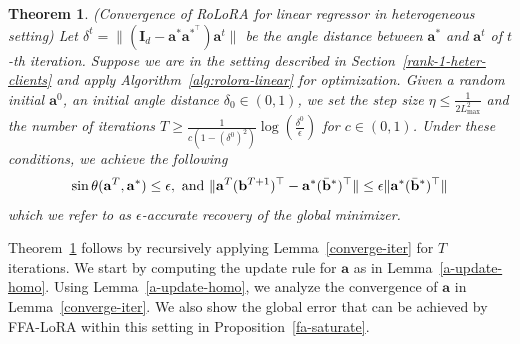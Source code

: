 \documentclass{article}
\theoremstyle{plain}
\newtheorem{theorem}{Theorem}[section]
\theoremstyle{definition}
\theoremstyle{remark}
\begin{document}
\begin{theorem} (Convergence of RoLoRA for linear regressor in heterogeneous setting) \label{convergence}
Let $\delta^t = \lVert (\mathbf{I}_d-\mathbf{a}^*\mathbf{a}^{*^\top})\mathbf{a}^t\rVert $ be the angle distance between $\mathbf{a}^{*}$ and $\mathbf{a}^{t}$ of $t$-th iteration. Suppose we are in the setting described in Section~\ref{rank-1-heter-clients} and apply Algorithm~\ref{alg:rolora-linear} for optimization. Given a random initial $\mathbf{a}^0$, an initial angle distance $\delta_0 \in (0,1)$, we set the step size $\eta \leq \frac{1}{2L^2_{\max}}$ and the number of iterations $T \geq \frac{1}{c (1-(\delta^{0})^2)} \log(\frac{\delta^0}{\epsilon}) $ for $c \in (0,1)$. Under these conditions, we achieve the following
\begin{align}
    \sin \theta (\mathbf{a}^T, \mathbf{a}^*)\leq \epsilon \nonumber , \text{ and } \lVert \mathbf{a}^T(\mathbf{b}^{T+1})^\top- \mathbf{a}^* (\Bar{\mathbf{b}}^*)^\top\rVert \leq \epsilon \lVert \mathbf{a}^* (\Bar{\mathbf{b}}^*)^\top \rVert \nonumber
\end{align}
which we refer to as $\epsilon$-accurate recovery of the global minimizer.
\end{theorem}
Theorem~\ref{convergence} follows by recursively applying Lemma~\ref{converge-iter} for $T$ iterations. We start by computing the update rule for ${\mathbf{a}}$ as in Lemma~\ref{a-update-homo}. Using Lemma~\ref{a-update-homo}, we analyze the convergence of ${\mathbf{a}}$ in Lemma~\ref{converge-iter}. We also show the global error that can be achieved by FFA-LoRA within this setting in Proposition~\ref{fa-saturate}.
\end{document}
